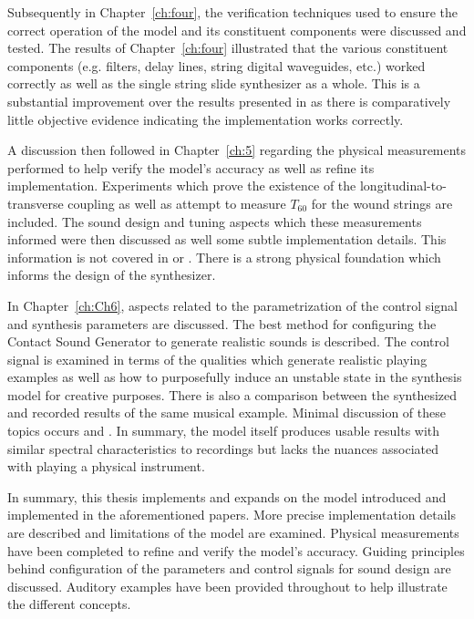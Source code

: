 \documentclass[../main.tex]{subfiles}
\begin{document}
Subsequently in Chapter~\ref{ch:four}, the verification techniques used to ensure the correct operation of the model and its constituent components were discussed and tested. The results of Chapter~\ref{ch:four} illustrated that the various constituent components (e.g. filters, delay lines, string digital waveguides, etc.) worked correctly as well as the single string slide synthesizer as a whole. This is a substantial improvement over the results presented in  as there is comparatively little objective evidence indicating the implementation works correctly.

A discussion then followed in Chapter~\ref{ch:5} regarding the physical measurements performed to help verify the model's accuracy as well as refine its implementation. Experiments which prove the existence of the longitudinal-to-transverse coupling as well as attempt to measure $T_{60}$ for the wound strings are included. The sound design and tuning aspects which these measurements informed were then discussed as well some subtle implementation details. This information is not covered in  or . There is a strong physical foundation which informs the design of the synthesizer.

In Chapter~\ref{ch:Ch6}, aspects related to the parametrization of the control signal and synthesis parameters are discussed. The best method for configuring the Contact Sound Generator to generate realistic sounds is described. The control signal is examined in terms of the qualities which generate realistic playing examples as well as how to purposefully induce an unstable state in the synthesis model for creative purposes. There is also a comparison between the synthesized and recorded results of the same musical example. Minimal discussion of these topics occurs  and . In summary, the model itself produces usable results with similar spectral characteristics to recordings but lacks the nuances associated with playing a physical instrument.

In summary, this thesis implements and expands on the model introduced and implemented in the aforementioned papers. More precise implementation details are described and limitations of the model are examined. Physical measurements have been completed to refine and verify the model's accuracy. Guiding principles behind configuration of the parameters and control signals for sound design are discussed. Auditory examples have been provided throughout to help illustrate the different concepts.
\end{document}

